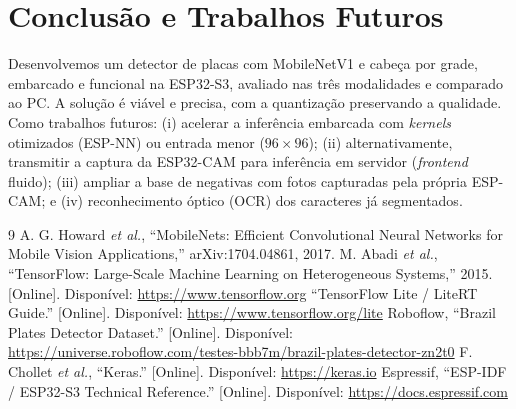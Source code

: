 \documentclass[conference]{IEEEtran}
\begin{document}
\section{Conclusão e Trabalhos Futuros}
Desenvolvemos um detector de placas com MobileNetV1 e cabeça por grade, embarcado e
funcional na ESP32-S3, avaliado nas três modalidades e comparado ao PC. A solução é
viável e precisa, com a quantização preservando a qualidade. Como trabalhos
futuros: (i) acelerar a inferência embarcada com \emph{kernels} otimizados (ESP-NN)
ou entrada menor ($96\times96$); (ii) alternativamente, transmitir a captura da
ESP32-CAM para inferência em servidor (\emph{frontend} fluido); (iii) ampliar a
base de negativas com fotos capturadas pela própria ESP-CAM; e (iv) reconhecimento
óptico (OCR) dos caracteres já segmentados.

\begin{thebibliography}{9}
 A. G. Howard \emph{et al.}, ``MobileNets: Efficient Convolutional
Neural Networks for Mobile Vision Applications,'' arXiv:1704.04861, 2017.
 M. Abadi \emph{et al.}, ``TensorFlow: Large-Scale Machine Learning on
Heterogeneous Systems,'' 2015. [Online]. Disponível: \url{https://www.tensorflow.org}
 ``TensorFlow Lite / LiteRT Guide.'' [Online]. Disponível:
\url{https://www.tensorflow.org/lite}
 Roboflow, ``Brazil Plates Detector Dataset.'' [Online]. Disponível:
\url{https://universe.roboflow.com/testes-bbb7m/brazil-plates-detector-zn2t0}
 F. Chollet \emph{et al.}, ``Keras.'' [Online]. Disponível:
\url{https://keras.io}
 Espressif, ``ESP-IDF / ESP32-S3 Technical Reference.'' [Online].
Disponível: \url{https://docs.espressif.com}
\end{thebibliography}
\end{document}
